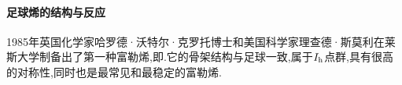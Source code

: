 \documentclass[draft]{ctexart}
\begin{document}
\paragraph{足球烯的结构与反应}
1985年英国化学家哈罗德·沃特尔·克罗托博士和美国科学家理查德·斯莫利在莱斯大学制备出了第一种富勒烯,即.它的骨架结构与足球一致,属于$I_{\text h}$点群,具有很高的对称性,同时也是最常见和最稳定的富勒烯.
\begin{figure}[H]
    \centering
\end{figure}
\end{document}
